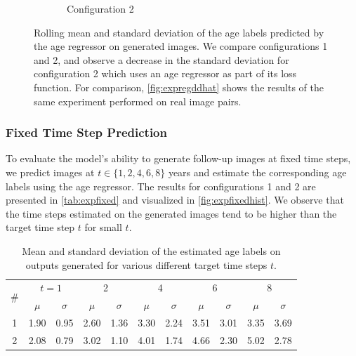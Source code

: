 \begin{figure}[h]
\begin{subfigure}{0.48\textwidth}
		\caption{\ Configuration 2}
	\end{subfigure}
	 
	\caption{Rolling mean and standard deviation of the age labels predicted by the age regressor on generated images. We compare configurations 1 and 2, and observe a decrease in the standard deviation for configuration 2 which uses an age regressor as part of its loss function. For comparison, \autoref{fig:expregddhat} shows the results of the same experiment performed on real image pairs.}
	\label{fig:expfollowuprolling}
\end{figure}

\subsubsection*{Fixed Time Step Prediction}
To evaluate the model's ability to generate follow-up images at fixed time steps, we predict images at $t \in \{1, 2, 4, 6, 8\}$ years and estimate the corresponding age labels using the age regressor. The results for configurations 1 and 2 are presented in \autoref{tab:expfixed} and visualized in \autoref{fig:expfixedhist}. We observe that the time steps estimated on the generated images tend to be higher than the target time step $t$ for small $t$.

\begin{table}[h]
	\begin{center}
		\begin{tabular}{c c c c c c c c c c c}
			\toprule
			\multirow{2}{*}{\#} &
			\multicolumn{2}{c}{$t = 1$} &
			\multicolumn{2}{c}{2} &
			\multicolumn{2}{c}{4} &
			\multicolumn{2}{c}{6} &
			\multicolumn{2}{c}{8} \\
			\cmidrule(lr){2-3}
			\cmidrule(lr){4-5}
			\cmidrule(lr){6-7}
			\cmidrule(lr){8-9}
			\cmidrule(lr){10-11}
			 & $\mu$ & $\sigma$ & $\mu$ & $\sigma$ & $\mu$ & $\sigma$ & $\mu$ & $\sigma$ & $\mu$ & $\sigma$ \\
			\cmidrule(lr){1-11}
			1 & 1.90 & 0.95 & 2.60 & 1.36 & 3.30 & 2.24 & 3.51 & 3.01 & 3.35 & 3.69 \\
			2 & 2.08 & 0.79 & 3.02 & 1.10 & 4.01 & 1.74 & 4.66 & 2.30 & 5.02 & 2.78 \\
			\bottomrule
		\end{tabular}
		\caption{Mean and standard deviation of the estimated age labels on outputs generated for various different target time steps $t$.}
		\label{tab:expfixed}
	\end{center}
\end{table}

